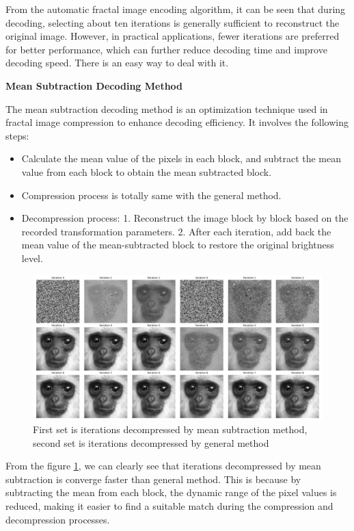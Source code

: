 \documentclass[a4paper,11pt, titlepage]{article}
\theoremstyle{definition}
\theoremstyle{plain}
\theoremstyle{remark}
\theoremstyle{definition}
\begin{document}
From the automatic fractal image encoding algorithm, it can be seen that during decoding, selecting about ten iterations is generally sufficient to reconstruct the original image. However, in practical applications, fewer iterations are preferred for better performance, which can further reduce decoding time and improve decoding speed. There is an easy way to deal with it.

\textbf{Mean Subtraction Decoding Method}

The mean subtraction decoding method is an optimization technique used in fractal image compression to enhance decoding efficiency. It involves the following steps:
\begin{itemize}
    \item Calculate the mean value of the pixels in each block, and subtract the mean value from each block to obtain the mean subtracted block.
    \item Compression process is totally same with the general method.
    \item Decompression process: 1. Reconstruct the image block by block based on the recorded transformation parameters. 2. After each iteration, add back the mean value of the mean-subtracted block to restore the original brightness level.
\end{itemize}

\begin{figure}
    \centering
    \includegraphics[width=\textwidth]{Mean Subtraction.png}
    \caption{First set is iterations decompressed by mean subtraction method, second set is iterations decompressed by general method}
    \label{fig:Mean Subtraction}
\end{figure}

From the figure \ref{fig:Mean Subtraction}, we can clearly see that iterations decompressed by mean subtraction is converge faster than general method. This is because by subtracting the mean from each block, the dynamic range of the pixel values is reduced, making it easier to find a suitable match during the compression and decompression processes. 
\end{document}
